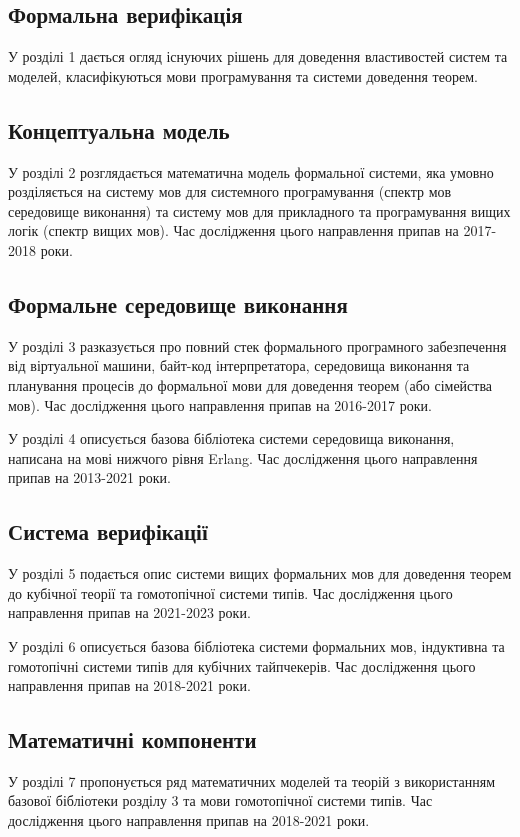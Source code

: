 \subsection*{Формальна верифікація}
У розділі 1 дається огляд існуючих рішень для доведення
властивостей систем та моделей, класифікуються мови програмування
та системи доведення теорем.

\subsection*{Концептуальна модель}
У розділі 2 розглядається математична модель формальної системи,
яка умовно розділяється на систему мов для системного
програмування (спектр мов середовище виконання) та систему мов для
прикладного та програмування вищих логік (спектр вищих мов).
Час дослідження цього направлення припав на 2017-2018 роки.

\subsection*{Формальне середовище виконання}
У розділі 3 разказується про повний стек формального програмного забезпечення
від віртуальної машини, байт-код інтерпретатора, середовища виконання
та планування процесів до формальної мови для доведення теорем (або сімейства мов).
Час дослідження цього направлення припав на 2016-2017 роки.

У розділі 4 описується базова бібліотека системи середовища виконання,
написана на мові нижчого рівня Erlang.
Час дослідження цього направлення припав на 2013-2021 роки.

\subsection*{Система верифікації}
У розділі 5 подається опис системи вищих формальних мов для доведення теорем до
кубічної теорії та гомотопічної системи типів.
Час дослідження цього направлення припав на 2021-2023 роки.

У розділі 6 описується базова бібліотека системи формальних мов, індуктивна
та гомотопічні системи типів для кубічних тайпчекерів.
Час дослідження цього направлення припав на 2018-2021 роки.

\newpage
\subsection*{Математичні компоненти}
У розділі 7 пропонується ряд математичних моделей та теорій з використанням
базової бібліотеки розділу 3 та мови гомотопічної системи типів.
Час дослідження цього направлення припав на 2018-2021 роки.

